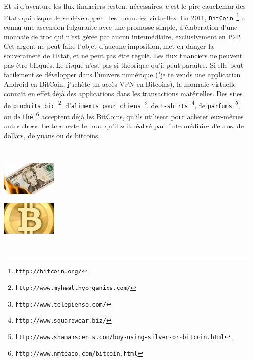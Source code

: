 \documentclass[11pt,twoside,a4paper]{article}
\begin{document}
Et si d'aventure les flux financiers restent n{\'e}cessaires, c'est le pire cauchemar des Etats qui risque de se d{\'e}velopper : les monnaies virtuelles. En 2011, \texttt{BitCoin~\footnote{\texttt{http://bitcoin.org/}}} a connu une ascension fulgurante avec une promesse simple, d'{\'e}laboration d'une monnaie de troc qui n'est g{\'e}r{\'e}e par aucun interm{\'e}diaire, exclusivement en P2P. Cet argent ne peut faire l'objet d'aucune imposition, met en danger la souverainet{\'e} de l'Etat, et ne peut pas {\^e}tre r{\'e}gul{\'e}. Les flux financiers ne peuvent pas {\^e}tre bloqu{\'e}s. Le risque n'est pas si th{\'e}orique qu'il peut para{\^i}tre. Si elle peut facilement se d{\'e}velopper dans l'univers num{\'e}rique ("je te vends une application Android en BitCoin, j'ach{\`e}te un acc{\`e}s VPN en Bitcoins), la monnaie virtuelle conna{\^i}t en effet d{\'e}j{\`a} des applications dans les transactions mat{\'e}rielles. Des sites de \texttt{produits bio~\footnote{\texttt{http://www.myhealthyorganics.com/}}}, d'\texttt{aliments pour chiens~\footnote{\texttt{http://www.telepienso.com/}}}, de \texttt{t-shirts~\footnote{\texttt{http://www.squarewear.biz/}}}, de \texttt{parfums~\footnote{\texttt{http://www.shamanscents.com/buy-using-silver-or-bitcoin.html}}}, ou de \texttt{th{\'e}~\footnote{\texttt{http://www.nmteaco.com/bitcoin.html}}} acceptent d{\'e}j{\`a} les BitCoins, qu'ils utilisent pour acheter eux-m{\^e}mes autre chose. Le troc reste le troc, qu'il soit r{\'e}alis{\'e} par l'interm{\'e}diaire d'euros, de dollars, de yuans ou de bitcoins. ~\\

\vfill

\begin{center}
	\begin{minipage}[ht]{6.00cm}
		~\\
	\end{minipage} \hfill \begin{minipage}[ht]{3.00cm}
		\includegraphics[width=2.75cm]{img/fluxfinanciers.png} 
	\end{minipage} \hfill \begin{minipage}[ht]{3.00cm}
		\includegraphics[width=2.75cm]{img/bitcoin-vign.png}
	\end{minipage} \hfill \begin{minipage}[ht]{6.00cm}
		~\\
	\end{minipage}
\end{center}
\end{document}
